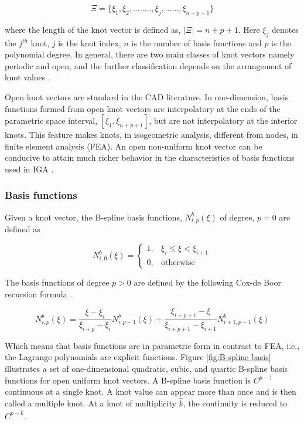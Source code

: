\documentclass[3p,preprint,12pt]{elsarticle}
\begin{document}
\begin{equation} \label{eq:KnotVectors}
\Xi=\{\xi_{1},\xi_{2},........,\xi_{j},......,\xi_{n+p+1}\}
\end{equation}

where the length of the knot vector is defined as, $|\Xi|=n+p+1$. Here $\xi_{j}$ denotes the $j^{th}$ knot, $j$ is the knot index, $n$ is the number of basis functions and $p$ is the polynomial degree. In general, there are two main classes of knot vectors namely periodic and open, and the further classification depends on the arrangement of knot values \cite{rogers2001introduction}.

Open knot vectors are standard in the CAD literature. In one-dimension, basis functions formed from open knot vectors are interpolatory at the ends of the parametric space interval, $[\xi_{1},\xi_{n+p+1}]$, but are not interpolatory at the interior knots. This feature makes knots, in isogeometric analysis, different from nodes, in finite element analysis (FEA). An open non-uniform knot vector can be conducive to attain much richer behavior in the characteristics of basis functions used in IGA \cite{cottrell2007studies}.

\subsubsection{Basis functions}
Given a knot vector, the B-spline basis functions, $N_{i,p}^{b}(\xi)$ of degree, $p=0$ are defined as

\begin{equation*}
N^{b}_{i,0}(\xi)=\begin{cases}
1, & \xi_{i}\leq\xi<\xi_{i+1}\\
0, & \text{otherwise}
\end{cases}
\end{equation*}

The basis functions of degree $p>0$ are defined by the following Cox-de Boor recursion formula \cite{piegl1997monographs}. 

\begin{equation}\label{eq:B-spline-N}
N^{b}_{i,p}(\xi)=\frac{\xi-\xi_{i}}{\xi_{i+p}-\xi_{i}}N_{i,p-1}^{b}(\xi)+\frac{\xi_{i+p+1}-\xi}{\xi_{i+p+1}-\xi_{i+1}}N_{i+1,p-1}^{b}(\xi) 
\end{equation}

Which means that basis functions are in parametric form in contrast to FEA, i.e., the Lagrange polynomials are explicit functions. Figure \ref{fig:B-spline basis} illustrates a set of one-dimensional quadratic, cubic, and quartic B-spline basis functions for open uniform knot vectors. A B-spline basis function is $C^{p-1}$ continuous at a single knot. A knot value can appear more than once and is then called a multiple knot. At a knot of multiplicity $\hat{k}$, the continuity is reduced to $C^{p-\hat{k}}$. 
\end{document}
